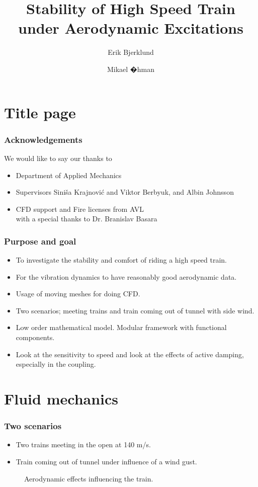 \documentclass{beamer}
\title{Stability of High Speed Train\\ under Aerodynamic Excitations}
\author{Erik Bjerklund \and Mikael �hman}
\begin{document}
\section{Title page} %
\begin{frame}
 \titlepage
\end{frame}

\begin{frame}
 \frametitle{Acknowledgements}
 We would like to say our thanks to
\begin{itemize}
 \item Department of Applied Mechanics
 \item Supervisors Sini\v{s}a Krajnovi\'{c} and Viktor Berbyuk, and Albin Johnsson
 \item CFD support and Fire licenses from AVL\\ with a special thanks to Dr. Branislav Basara 
\end{itemize}
\end{frame}

\begin{frame}
 \frametitle{Purpose and goal}
 \begin{itemize}
  \item To investigate the stability and comfort of riding a high speed train.
  \item For the vibration dynamics to have reasonably good aerodynamic data.
  \item Usage of moving meshes for doing CFD.
  \item Two scenarios; meeting trains and train coming out of tunnel with side wind.
  \item Low order mathematical model. Modular framework with functional components.
  \item Look at the sensitivity to speed and look at the effects of active damping, especially in the coupling.
 \end{itemize}
\end{frame}

\section{Fluid mechanics}
\begin{frame}
 \frametitle{Two scenarios}
 \begin{itemize}
  \item Two trains meeting in the open at 140 m/s.
  \item Train coming out of tunnel under influence of a wind gust.
 \end{itemize}
  \begin{figure}
	\centering
	\caption{Aerodynamic effects influencing the train.}
  \end{figure}
\end{frame}
\end{document}
